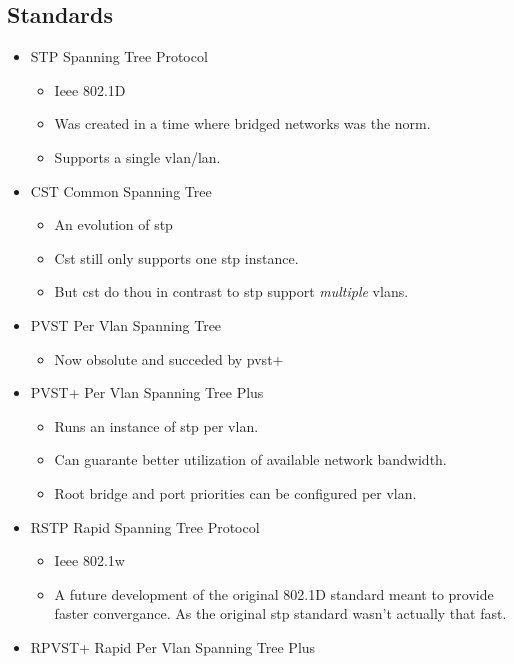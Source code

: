\subsection{Standards}

\begin{itemize}
    \item STP {\scriptsize Spanning Tree Protocol}
    \begin{itemize}
        \item Ieee 802.1D
        \item Was created in a time where bridged networks was the norm.
        \item Supports a single vlan/lan.
    \end{itemize}
    \item CST {\scriptsize Common Spanning Tree}
    \begin{itemize}
        \item An evolution of stp
        \item Cst still only supports one stp instance.
        \item But cst do thou in contrast to stp support \textit{multiple} vlans.
    \end{itemize}
    \item PVST {\scriptsize Per Vlan Spanning Tree}
    \begin{itemize}
        \item Now obsolute and succeded by pvst+
    \end{itemize}
    \item PVST+ {\scriptsize Per Vlan Spanning Tree Plus}
    \begin{itemize}
        \item Runs an instance of stp per vlan.
        \item Can guarante better utilization of available network bandwidth.
        \item Root bridge and port priorities can be configured per vlan.
    \end{itemize}
    \item RSTP {\scriptsize Rapid Spanning Tree Protocol}
    \begin{itemize}
        \item Ieee 802.1w
        \item A future development of the original 802.1D standard meant to provide faster convergance. As the original stp standard wasn't actually that fast.
    \end{itemize}
    \item RPVST+ {\scriptsize Rapid Per Vlan Spanning Tree Plus}

\end{itemize}
